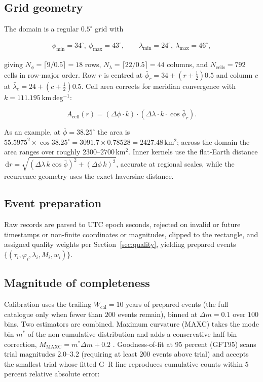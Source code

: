 \documentclass[11pt,a4paper]{article}
\newcommand{\dd}{\,\mathrm{d}}
\begin{document}
\subsection{Grid geometry}
The domain is a regular $0.5^\circ$ grid with

\begin{align}
\phi_{\min}=34^\circ,\ \phi_{\max}=43^\circ,\qquad
\lambda_{\min}=24^\circ,\ \lambda_{\max}=46^\circ,
\end{align}

giving $N_\phi=\lceil9/0.5\rceil=18$ rows, $N_\lambda=\lceil22/0.5\rceil=44$
columns, and $N_{\text{cells}}=792$ cells in row-major order. Row $r$ is
centred at $\bar\phi_r=34+(r+\tfrac12)0.5$ and column $c$ at
$\bar\lambda_c=24+(c+\tfrac12)0.5$. Cell area corrects for meridian
convergence with $k=111.195$\,km\,deg$^{-1}$:

\begin{equation}
A_{\text{cell}}(r)=(\Delta\phi\cdot k)\cdot(\Delta\lambda\cdot k\cdot
\cos\bar\phi_r).
\end{equation}

As an example, at $\bar\phi=38.25^\circ$ the area is
$55.5975^2\times\cos38.25^\circ=3091.7\times0.78528=2427.48$\,km$^2$; across
the domain the area ranges over roughly $2300$--$2700$\,km$^2$. Inner kernels
use the flat-Earth distance
$\dd r=\sqrt{(\Delta\lambda\,k\cos\bar\phi)^2+(\Delta\phi\,k)^2}$, accurate at
regional scales, while the recurrence geometry uses the exact haversine
distance.

\subsection{Event preparation}
Raw records are parsed to UTC epoch seconds, rejected on invalid or future
timestamps or non-finite coordinates or magnitudes, clipped to the rectangle,
and assigned quality weights per Section~\ref{sec:quality}, yielding prepared
events $\{(\tau_i,\varphi_i,\lambda_i,M_i,w_i)\}$.

\subsection{Magnitude of completeness}\label{sec:mc}
Calibration uses the trailing $W_{\text{cal}}=10$ years of prepared events
(the full catalogue only when fewer than $200$ events remain), binned at
$\Delta m=0.1$ over $100$ bins. Two estimators are combined. Maximum
curvature (MAXC) takes the mode bin $m^*$ of the non-cumulative distribution
and adds a conservative half-bin correction,
$M_{\mathrm{MAXC}}=m^*\Delta m+0.2$ \cite{weimer2000}. Goodness-of-fit at 95
percent (GFT95) scans trial magnitudes $2.0$--$3.2$ (requiring at least $200$
events above trial) and accepts the smallest trial whose fitted G--R line
reproduces cumulative counts within $5$ percent relative absolute error:
\end{document}
